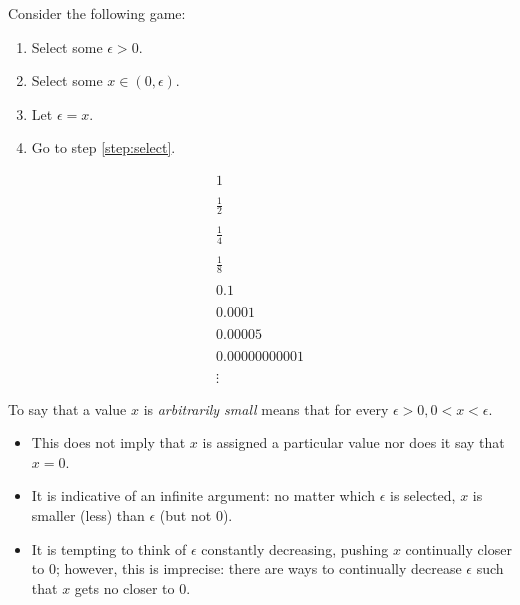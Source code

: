 \documentclass[letterpaper,12pt,fleqn]{article}
\newcommand{\e}{\epsilon}
\begin{document}
\begin{example}
  Consider the following game:
  \begin{enumerate}
  \item Select some \(\e>0\).
  \item\label{step:select} Select some \(x\in(0,\e)\).
  \item Let \(\e=x\).
  \item Go to step \ref{step:select}.
  \end{enumerate}

  \[\begin{array}{l}
  1 \\
  \\
  \frac{1}{2} \\
  \\
  \frac{1}{4} \\
  \\
  \frac{1}{8} \\
  \\
  0.1 \\
  \\
  0.0001 \\
  \\
  0.00005 \\
  \\
  0.00000000001 \\
  \\
  \vdots
  \end{array}\]
\end{example}

\begin{definition}
  To say that a value \(x\) is \emph{arbitrarily small} means that for every \(\e>0,0<x<\e\).
\end{definition}

\begin{itemize}[left=0in]
\item This does not imply that \(x\) is assigned a particular value nor does it say that \(x=0\).
\item It is indicative of an infinite argument: no matter which \(\e\) is selected, \(x\) is smaller (less) than
  \(\e\) (but not \(0\)).
\item It is tempting to think of \(\e\) constantly decreasing, pushing \(x\) continually closer to \(0\); however,
  this is imprecise: there are ways to continually decrease \(\e\) such that \(x\) gets no closer to \(0\).
\end{itemize}
\end{document}
